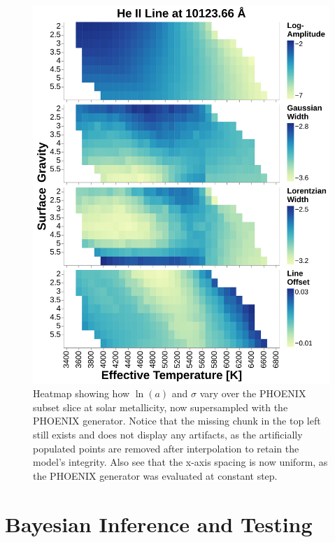 \documentclass[twocolumn]{aastex631}
\begin{document}
\begin{figure}
    \centering
    \includegraphics[width=\textwidth]{figure4}
    \caption{Heatmap showing how $\ln(a)$ and $\sigma$ vary over the PHOENIX subset slice at solar metallicity, now supersampled with the PHOENIX generator. 
    Notice that the missing chunk in the top left still exists and does not display any artifacts, as the artificially populated points are removed after interpolation to retain the model's integrity. 
    Also see that the x-axis spacing is now uniform, as the PHOENIX generator was evaluated at constant step.}
    \label{fig:figure4}
\end{figure}

\section{Bayesian Inference and Testing}
\end{document}
